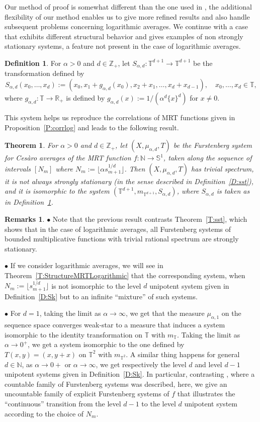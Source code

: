 \documentclass[11pt]{amsart}
\newtheorem{theorem}[lemma]{Theorem}
\theoremstyle{definition}
\newtheorem{definition}{Definition}[section]
\newtheorem*{remarks}{Remarks}
\newcommand{\N}{{\mathbb N}}
\newcommand{\R}{{\mathbb R}}
\renewcommand{\S}{\mathbb{S}}
\newcommand{\T}{{\mathbb T}}
\newcommand{\Z}{{\mathbb Z}}
\begin{document}
Our method of proof is somewhat different than the one used in  \cite{GLR21}, the additional flexibility of our method enables us to  give more refined results and also handle subsequent problems concerning  logarithmic averages. We continue with a case that exhibits different structural behavior and gives examples of non strongly stationary systems, a feature not present in the case of logarithmic averages.
\begin{definition}\label{D:Sad}
	For  $\alpha>0$ and $d\in \Z_+$,  let $S_{\alpha,d}\colon \T^{d+1}\to \T^{d+1}$ be the transformation defined by
$$
S_{\alpha,d}(x_0,\ldots, x_d):=(x_0,x_1+g_{\alpha,d}(x_0),x_2+x_1,\ldots, x_d+x_{d-1}),  \quad x_0,\ldots, x_d\in \T,
$$
where $g_{\alpha,d}\colon \T\to \R_+$ is defined by $g_{\alpha,d}(x):=1 /(\alpha^d\{x\}^d)$ for
$x\neq 0$.
\end{definition}
This system helps us reproduce the correlations of MRT functions given in Proposition~\ref{P:corrlog}
and leads to the following result.
\begin{theorem}\label{T:StructureMRTCesaro1}
For $\alpha>0$ and $d\in \Z_+$, 	let $(X,\mu_{\alpha,d},T)$ be the  Furstenberg system for Ces\`aro averages of the MRT function  $f\colon \N\to \S^1$, taken  along the sequence of intervals $[N_m]$ where  $N_m:=\lfloor\alpha s_{m+1}^{1/d}\rfloor$. Then $(X,\mu_{\alpha,d},T)$  has trivial spectrum, it  is not always strongly stationary (in the sense described in Definition~\ref{D:sst}),  and it is  isomorphic to the system  $(\T^{d+1},m_{\T^{d+1}},S_{\alpha,d})$, where $S_{\alpha,d}$ is taken as in Definition~\ref{D:Sad}.
\end{theorem}
\begin{remarks}
	$\bullet$ 		Note that the previous result contrasts Theorem~\ref{T:sst}, which shows that in the case of logarithmic averages, all Furstenberg systems of bounded multiplicative functions with trivial rational spectrum are strongly stationary.
	
	$\bullet$ 		If  we consider logarithmic averages, we will see in Theorem~\ref{T:StructureMRTLogarithmic} that the corresponding system, when
	$N_m:=\lfloor s_{m+1}^{1/d}\rfloor$  is not isomorphic to the level $d$ unipotent system given in Definition~\ref{D:Sk} but to   an infinite ``mixture'' of such systems.
	
	$\bullet$  For $d=1$, taking the limit as $\alpha \to \infty$, we get that the measure
	$\mu_{\alpha,1}$ on the sequence space converges  weak-star to a measure that induces a system isomorphic to the identity transformation on $\T$ with $m_\T$. Taking the limit as $\alpha \to 0^+$, we get a system isomorphic to the  one defined by $T(x,y)=(x,y+x)$  on $\T^2$ with $m_{\T^2}$.   A similar thing happens for general $d\in \N$,
	as $\alpha\to 0+$ or $\alpha\to \infty$, we get respectively  the level $d$ and level $d-1$  unipotent systems given in Definition~\ref{D:Sk}.
In particular,  contrasting \cite{GLR21}, where a countable family of Furstenberg systems was described, here, we give an uncountable family of explicit Furstenberg systems of $f$ that illustrates the ``continuous'' transition from the level $d-1$ to the level $d$ unipotent system according to the choice of $N_m$.	
\end{remarks}
\end{document}
